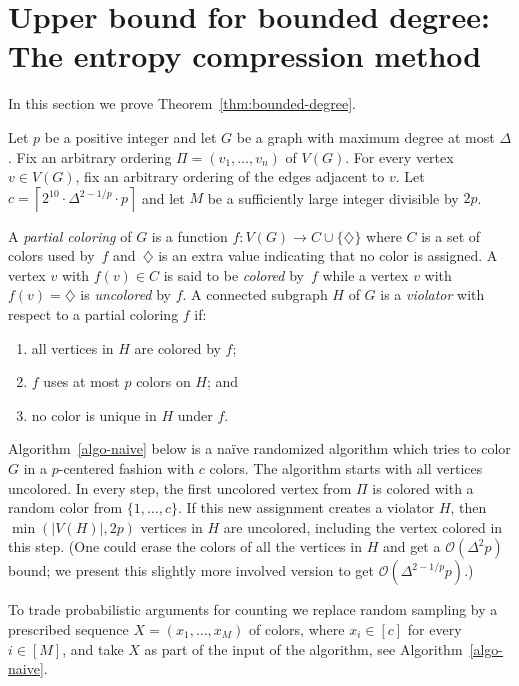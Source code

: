 \section{Upper bound for bounded degree:
   The entropy compression method}
\label{sec-bounded-degree}

In this section we prove Theorem~\ref{thm:bounded-degree}.

Let $p$ be a positive integer and let $G$ be a graph with maximum degree at
most $\Delta$.  Fix an arbitrary ordering $\Pi=(v_1,\ldots,v_n)$ of $V(G)$.
For every vertex $v\in V(G)$, fix an arbitrary ordering of the edges adjacent
to $v$.  Let $c=\left\lceil2^{10}\cdot\Delta^{2-1/p}\cdot p\right\rceil$ and
let $M$ be a sufficiently large integer divisible by $2p$.

A \emph{partial coloring} of $G$ is a function $f: V(G)\to C\cup\{\diamondsuit\}$ 
where $C$ is a set of \textrm{colors} used by~$f$ and~$\diamondsuit$ is an extra value 
indicating that no color is assigned.
A vertex $v$ with $f(v)\in C$ is said to be \emph{colored} by~$f$ 
while a vertex $v$ with $f(v)=\diamondsuit$ is \emph{uncolored} by $f$.
A connected subgraph $H$ of $G$ is a \emph{violator} with respect to 
a partial coloring $f$ if:
\begin{enumerate}
\item all vertices in $H$ are colored by $f$;
\item $f$ uses at most $p$ colors on $H$; and
\item no color is unique in $H$ under $f$.
\end{enumerate}

Algorithm~\ref{algo-naive} below is a naïve randomized algorithm 
which tries to color $G$ in a $p$-centered fashion with $c$ colors.
The algorithm starts with all vertices uncolored.
In every step, the first uncolored vertex from $\Pi$ is colored with 
a random color from $\{1,\ldots,c\}$.
If this new assignment creates a violator $H$, then 
$\min(|V(H)|,2p)$ vertices in $H$ are uncolored, 
including the vertex colored in this step.
(One could erase the colors of all the vertices in $H$ and get a $\mathcal{O}(\Delta^2p)$ bound; 
we present this slightly more involved version to get $\mathcal{O}(\Delta^{2-1/p}p)$.)

To trade probabilistic arguments for counting we
replace random sampling by a prescribed sequence $X=(x_1,\ldots,x_M)$ of colors,
where $x_i\in [c]$ for every $i\in[M]$,
and take $X$ as part of the input of the algorithm,
see Algorithm~\ref{algo-naive}.

